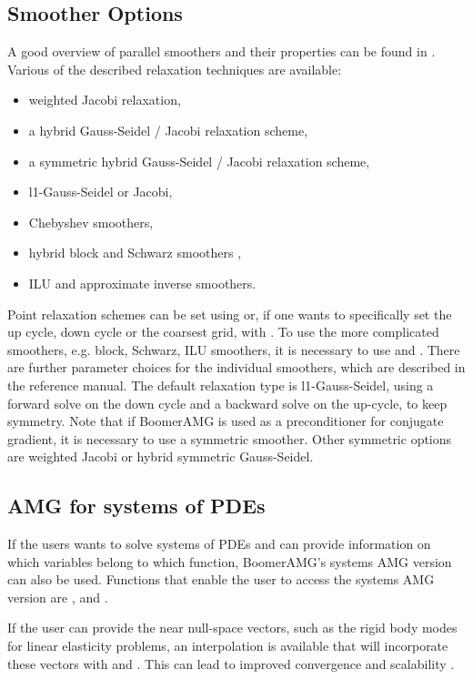 \subsection{Smoother Options}
A good overview of parallel smoothers and their properties can be found in \cite{Baker_Falgout_Kolev_UMYang_2011}. Various of the described relaxation techniques are available:
\begin{itemize}
\item weighted Jacobi relaxation,
\item a hybrid Gauss-Seidel / Jacobi relaxation scheme, 
\item a symmetric hybrid Gauss-Seidel / Jacobi relaxation scheme, 
\item l1-Gauss-Seidel or Jacobi,
\item Chebyshev smoothers,
\item hybrid block and Schwarz smoothers \cite{UMYang_2004},
\item ILU and approximate inverse smoothers.
\end{itemize}
Point relaxation schemes can be set using  or, if
one wants to specifically set the up cycle, down cycle or the coarsest grid, with 
. To use the more complicated smoothers,
e.g. block, Schwarz, ILU smoothers, it is necessary to use 
and . There are further parameter choices for the
individual smoothers, which are described in the reference manual.
The default relaxation type is l1-Gauss-Seidel, using a forward solve
on the down cycle and a backward solve on the up-cycle, to keep symmetry. Note that if
BoomerAMG is used as a preconditioner for conjugate gradient, it is necessary to use
a symmetric smoother. Other symmetric options are weighted Jacobi or hybrid symmetric Gauss-Seidel.

\subsection{AMG for systems of PDEs}
 
If the users wants to solve systems of PDEs and can provide information on
which variables belong to which function, BoomerAMG's systems AMG version
can also be used. Functions that enable the user to access the systems AMG version 
are , 
and .

If the user can provide the near null-space vectors, such as the rigid body modes for linear elasticity problems, an interpolation is available that will incorporate these vectors with  and . This can lead to improved convergence and scalability \cite{Baker_Kolev_UMYang_2010}.

